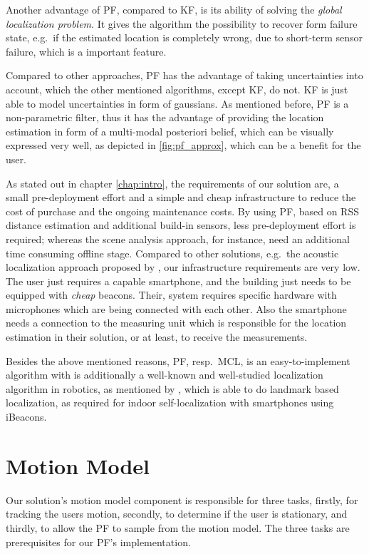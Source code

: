 Another advantage of \acs{PF}, compared to \acs{KF}, is its ability of solving the \emph{global localization problem}. It gives the algorithm the possibility to recover form failure state, e.g.\ if the estimated location is completely wrong, due to short-term sensor failure, which is a important feature.

Compared to other approaches, \acs{PF} has the advantage of taking uncertainties into account, which the other mentioned algorithms, except \acs{KF}, do not. \acs{KF} is just able to model uncertainties in form of gaussians. As mentioned before, \acs{PF} is a non-parametric filter, thus it has the advantage of providing the location estimation in form of a multi-modal posteriori belief, which can be visually expressed very well, as depicted in \ref{fig:pf_approx}, which can be a benefit for the user.

As stated out in chapter \ref{chap:intro}, the requirements of our solution are, a small pre-deployment effort and a simple and cheap infrastructure to reduce the cost of purchase and the ongoing maintenance costs. By using \acs{PF}, based on \acs{RSS} distance estimation and additional build-in sensors, less pre-deployment effort is required; whereas the scene analysis approach, for instance, need an additional time consuming offline stage. Compared to other solutions, e.g.\ the acoustic localization approach proposed by \citet{hoflinger:acoustic}, our infrastructure requirements are very low. The user just requires a capable smartphone, and the building just needs to be equipped with \emph{cheap} beacons. Their, system requires specific hardware with microphones which are being connected with each other. Also the smartphone needs a connection to the measuring unit which is responsible for the location estimation in their solution, or at least, to receive the measurements.

Besides the above mentioned reasons, \acl{PF}, resp.\ \acs{MCL}, is an easy-to-implement algorithm with is additionally a well-known and well-studied localization algorithm in robotics, as mentioned by \citet{thrun:prob_robo}, which is able to do landmark based localization, as required for indoor self-localization with smartphones using iBeacons.

\section{Motion Model}\label{sec:algo_motion_model}
Our solution's motion model component is responsible for three tasks, firstly, for tracking the users motion, secondly, to determine if the user is stationary, and thirdly, to allow the \acs{PF} to sample from the motion model. The three tasks are prerequisites for our \acs{PF}'s implementation.

